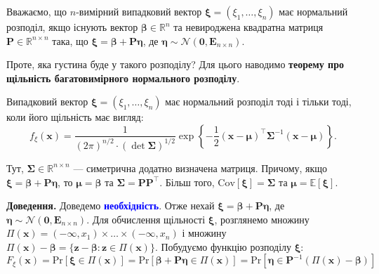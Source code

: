 \documentclass{../hw_template}
\begin{document}
\begin{definition}
    Вважаємо, що $n$-вимірний випадковий вектор $\boldsymbol{\xi}=(\xi_1,\dots,\xi_n)$ має нормальний розподіл, якщо 
    існують вектор $\boldsymbol{\beta} \in \mathbb{R}^n$ та невироджена квадратна матриця $\boldsymbol{P} \in \mathbb{R}^{n \times n}$ 
    така, що $\boldsymbol{\xi} = \boldsymbol{\beta} + \boldsymbol{P\eta}$, де $\boldsymbol{\eta} \sim \mathcal{N}(\mathbf{0}, \boldsymbol{E}_{n \times n})$.
\end{definition}

Проте, яка густина буде у такого розподілу? Для цього наводимо \textbf{теорему
про щільність багатовимірного нормального розподілу}.

\begin{theorem}
    Випадковий вектор $\boldsymbol{\xi} = (\xi_1,\dots,\xi_n)$ має нормальний розподіл 
    тоді і тільки тоді, коли його щільність має вигляд:
    \begin{equation*}
        f_{\xi}(\mathbf{x}) = \frac{1}{(2\pi)^{n/2} \cdot (\det \boldsymbol{\Sigma})^{1/2}}\exp\left\{-\frac{1}{2}(\mathbf{x}-\boldsymbol{\mu})^{\top}\boldsymbol{\Sigma}^{-1}(\mathbf{x} - \boldsymbol{\mu})\right\}.
    \end{equation*}

    Тут, $\boldsymbol{\Sigma} \in \mathbb{R}^{n \times n}$ --- симетрична додатно визначена 
    матриця. Причому, якщо $\boldsymbol{\xi} = \boldsymbol{\beta} + \boldsymbol{P\eta}$, то $\boldsymbol{\mu}=\boldsymbol{\beta}$
    та $\boldsymbol{\Sigma} = \boldsymbol{PP}^{\top}$. Більш того, $\text{Cov}[\boldsymbol{\xi}] = \boldsymbol{\Sigma}$ та 
    $\boldsymbol{\mu} = \mathbb{E}[\boldsymbol{\xi}]$.
\end{theorem}

\textbf{Доведення.} Доведемо \textcolor{blue}{\textbf{необхідність}}. Отже нехай $\boldsymbol{\xi} = \boldsymbol{\beta} + \boldsymbol{P\eta}$, де 
$\boldsymbol{\eta} \sim \mathcal{N}(\mathbf{0}, \boldsymbol{E}_{n \times n})$. Для обчислення щільності 
$\boldsymbol{\xi}$, розглянемо множину $\Pi(\mathbf{x}) = (-\infty, x_1) \times \dots \times (-\infty, x_n)$ і 
множину $\Pi(\mathbf{x})-\boldsymbol{\beta} = \{\mathbf{z} - \boldsymbol{\beta}: \mathbf{z} \in \Pi(\mathbf{x})\}$. Побудуємо 
функцію розподілу $\boldsymbol{\xi}$:
\begin{equation*}
    F_{\xi}(\mathbf{x}) = \text{Pr}[\boldsymbol{\xi} \in \Pi(\mathbf{x})] = \text{Pr}[\boldsymbol{\beta}+\boldsymbol{P\eta} \in \Pi(\mathbf{x})] = \text{Pr}[\boldsymbol{\eta} \in \boldsymbol{P}^{-1}(\Pi(\mathbf{x})-\boldsymbol{\beta})]
\end{equation*}
\end{document}
